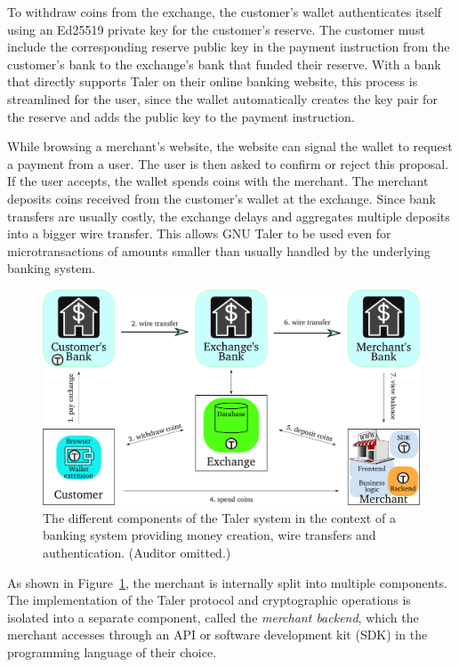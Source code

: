 To withdraw coins from the exchange, the customer's wallet authenticates itself
using an Ed25519 private key for the customer's reserve.  The customer must
include the corresponding reserve public key in the payment instruction from
the customer's bank to the exchange's bank that funded their reserve.  With a
bank that directly supports Taler on their online banking website, this process
is streamlined for the user, since the wallet automatically creates the key
pair for the reserve and adds the public key to the payment instruction.


While browsing a merchant's website, the website can signal the wallet to
request a payment from a user. The user is then asked to confirm or reject this
proposal.  If the user accepts, the wallet spends coins with the merchant.  The
merchant deposits coins received from the customer's wallet at the exchange.
Since bank transfers are usually costly, the exchange delays and aggregates
multiple deposits into a bigger wire transfer.  This allows GNU Taler to be
used even for microtransactions of amounts smaller than usually handled by the
underlying banking system.

\begin{figure}
  \includegraphics[width=\columnwidth]{taler-arch-full.pdf}
  \caption[Components of GNU Taler in the context of a banking system.]{The different components of the Taler system in the
    context of a banking system providing money creation,
    wire transfers and authentication. (Auditor omitted.)}
  \label{fig:taler-arch-full}
\end{figure}

As shown in Figure~\ref{fig:taler-arch-full}, the merchant is internally split
into multiple components.  The implementation of the Taler protocol and
cryptographic operations is isolated into a separate component, called the
\emph{merchant backend}, which the merchant accesses through an API or software
development kit (SDK) in the programming language of their choice.

